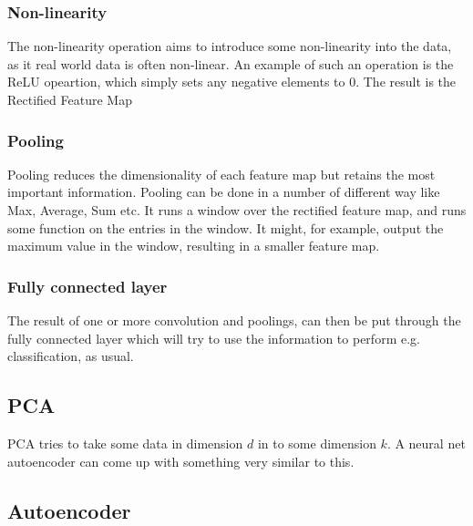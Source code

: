     \subsubsection{Non-linearity}
    The non-linearity operation aims to introduce some non-linearity into the 
    data, as it real world data is often non-linear. An example of such an 
    operation is the ReLU opeartion, which simply sets any negative elements to 
    $0$. The result is the Rectified Feature Map
    
    \subsubsection{Pooling}
    Pooling reduces the dimensionality of each feature map but retains the most 
    important information. Pooling can be done in a number of different way 
    like Max, Average, Sum etc. It runs a window over the rectified feature 
    map, and runs some function on the entries in the window. It might, for 
    example, output the maximum value in the window, resulting in a smaller 
    feature map.
    
    \subsubsection{Fully connected layer}
    The result of one or more convolution and poolings, can then be put through 
    the fully connected layer which will try to use the information to perform 
    e.g. classification, as usual.
    
    \subsection{PCA}
    PCA tries to take some data in dimension $d$ in to some dimension $k$. A 
    neural net autoencoder can come up with something very similar to this.
    
    \subsection{Autoencoder}
    
